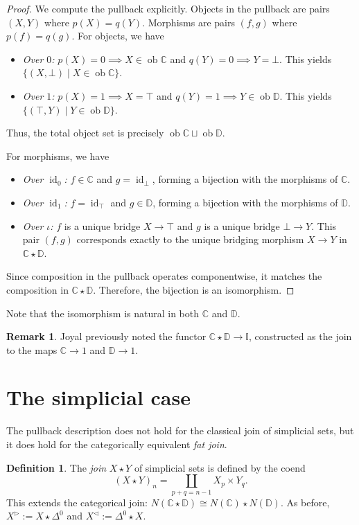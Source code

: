 \documentclass{article}
\theoremstyle{definition}
\newtheorem{definition}[proposition]{Definition}
\newtheorem{remark}[proposition]{Remark}
\newcommand{\C}{\mathbb{C}}
\newcommand{\D}{\mathbb{D}}
\newcommand{\I}{\mathbb{I}}
\DeclareMathOperator{\ob}{ob}
\DeclareMathOperator{\id}{id}
\begin{document}
\begin{proof}
	We compute the pullback explicitly. Objects in the pullback are pairs $(X,Y)$ where $p(X) = q(Y)$. Morphisms are pairs $(f,g)$ where $p(f) = q(g)$.
	For objects, we have
	\begin{itemize}
		\item \emph{Over $0$:} $p(X) = 0 \implies X \in \ob\C$ and $q(Y) = 0 \implies Y = \bot$. This yields $\{(X, \bot) \mid X \in \ob\C\}$.
		\item \emph{Over $1$:} $p(X) = 1 \implies X = \top$ and $q(Y) = 1 \implies Y \in \ob\D$. This yields $\{(\top, Y) \mid Y \in \ob\D\}$.
	\end{itemize}
	Thus, the total object set is precisely $\ob\C \sqcup \ob\D$.

	For morphisms, we have
	\begin{itemize}
		\item \emph{Over $\id_0$:} $f \in \C$ and $g = \id_\bot$, forming a bijection with the morphisms of $\C$.
		\item \emph{Over $\id_1$:} $f = \id_\top$ and $g \in \D$, forming a bijection with the morphisms of $\D$.
		\item \emph{Over $\iota$:} $f$ is a unique bridge $X \to \top$ and $g$ is a unique bridge $\bot \to Y$. This pair $(f,g)$ corresponds exactly to the unique bridging morphism $X \to Y$ in $\C \star \D$.
	\end{itemize}
	Since composition in the pullback operates componentwise, it matches the composition in $\C \star \D$. Therefore, the bijection is an isomorphism.
\end{proof}

Note that the isomorphism is natural in both $\C$ and $\D$.

\begin{remark}\label{joyal}
	Joyal previously noted the functor $\C \star \D \to \I$, constructed as the join to the maps $\C \to 1$ and $\D \to 1$.
\end{remark}

\section{The simplicial case}

The pullback description does not hold for the classical join of simplicial sets, but it does hold for the categorically equivalent \emph{fat join}.

\begin{definition}\label{classical-join}
	The \emph{join} $X \star Y$ of simplicial sets is defined by the coend
	\[(X \star Y)_n = \coprod_{p+q=n-1} X_p \times Y_q.\]
	This extends the categorical join: $N(\C \star \D) \cong N(\C) \star N(\D)$. As before, $X^\triangleright := X \star \Delta^0$ and $X^\triangleleft := \Delta^0 \star X$.
\end{definition}
\end{document}
